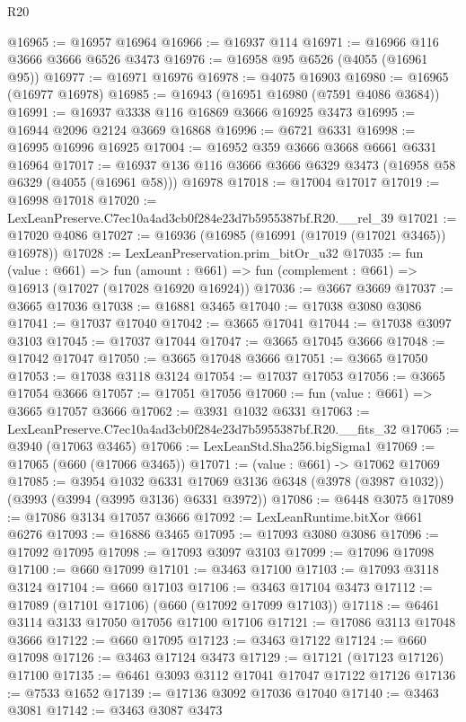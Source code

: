 \begin{lexlean}{R20}
\begin{coremodule}
@16965 := @16957 @16964
@16966 := @16937 @114
@16971 := @16966 @116 @3666 @3666 @6526 @3473
@16976 := @16958 @95 @6526 (@4055 (@16961 @95))
@16977 := @16971 @16976
@16978 := @4075 @16903
@16980 := @16965 (@16977 @16978)
@16985 := @16943 (@16951 @16980 (@7591 @4086 @3684))
@16991 := @16937 @3338 @116 @16869 @3666 @16925 @3473
@16995 := @16944 @2096 @2124 @3669 @16868
@16996 := @6721 @6331
@16998 := @16995 @16996 @16925
@17004 := @16952 @359 @3666 @3668 @6661 @6331 @16964
@17017 := @16937 @136 @116 @3666 @3666 @6329 @3473 (@16958 @58 @6329 (@4055 (@16961 @58))) @16978
@17018 := @17004 @17017
@17019 := @16998 @17018
@17020 := LexLeanPreserve.C7ec10a4ad3cb0f284e23d7b5955387bf.R20.__rel_39
@17021 := @17020 @4086
@17027 := @16936 (@16985 (@16991 (@17019 (@17021 @3465)) @16978))
@17028 := LexLeanPreservation.prim_bitOr_u32
@17035 := fun (value : @661) =>
  fun (amount : @661) => fun (complement : @661) => @16913 (@17027 (@17028 @16920 @16924))
@17036 := @3667 @3669
@17037 := @3665 @17036
@17038 := @16881 @3465
@17040 := @17038 @3080 @3086
@17041 := @17037 @17040
@17042 := @3665 @17041
@17044 := @17038 @3097 @3103
@17045 := @17037 @17044
@17047 := @3665 @17045 @3666
@17048 := @17042 @17047
@17050 := @3665 @17048 @3666
@17051 := @3665 @17050
@17053 := @17038 @3118 @3124
@17054 := @17037 @17053
@17056 := @3665 @17054 @3666
@17057 := @17051 @17056
@17060 := fun (value : @661) => @3665 @17057 @3666
@17062 := @3931 @1032 @6331
@17063 := LexLeanPreserve.C7ec10a4ad3cb0f284e23d7b5955387bf.R20.__fits_32
@17065 := @3940 (@17063 @3465)
@17066 := LexLeanStd.Sha256.bigSigma1
@17069 := @17065 (@660 (@17066 @3465))
@17071 := (value : @661) -> @17062 @17069
@17085 := @3954
    @1032
    @6331
    @17069
    @3136
    @6348
    (@3978 (@3987 @1032))
    (@3993 (@3994 (@3995 @3136) @6331 @3972))
@17086 := @6448 @3075
@17089 := @17086 @3134 @17057 @3666
@17092 := LexLeanRuntime.bitXor @661 @6276
@17093 := @16886 @3465
@17095 := @17093 @3080 @3086
@17096 := @17092 @17095
@17098 := @17093 @3097 @3103
@17099 := @17096 @17098
@17100 := @660 @17099
@17101 := @3463 @17100
@17103 := @17093 @3118 @3124
@17104 := @660 @17103
@17106 := @3463 @17104 @3473
@17112 := @17089 (@17101 @17106) (@660 (@17092 @17099 @17103))
@17118 := @6461 @3114 @3133 @17050 @17056 @17100 @17106
@17121 := @17086 @3113 @17048 @3666
@17122 := @660 @17095
@17123 := @3463 @17122
@17124 := @660 @17098
@17126 := @3463 @17124 @3473
@17129 := @17121 (@17123 @17126) @17100
@17135 := @6461 @3093 @3112 @17041 @17047 @17122 @17126
@17136 := @7533 @1652
@17139 := @17136 @3092 @17036 @17040
@17140 := @3463 @3081
@17142 := @3463 @3087 @3473

\end{coremodule}
\end{lexlean}
